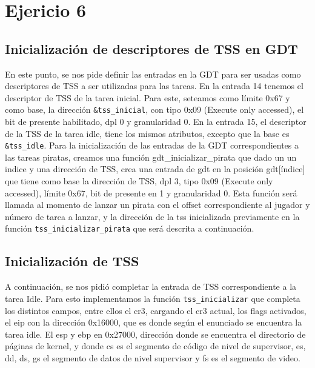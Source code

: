 \section{Ejericio 6}
\subsection{Inicialización de descriptores de TSS en GDT}

En este punto, se nos pide definir las entradas en la GDT para ser usadas como descriptores de TSS a ser utilizadas para las tareas.
En la entrada 14 tenemos el descriptor de TSS de la tarea inicial. Para este, seteamos como límite 0x67 y como base, la dirección \texttt{\&tss\_inicial}, con tipo 0x09 (Execute only accessed), el bit de presente habilitado, dpl 0 y granularidad 0.
En la entrada 15, el descriptor de la TSS de la tarea idle, tiene los mismos atributos, excepto que la base es \texttt{\&tss\_idle}.
Para la inicialización de las entradas de la GDT correspondientes a las tareas piratas, creamos una función gdt\_inicializar\_pirata que dado un un indice y una dirección de TSS, crea una entrada de gdt en la posición gdt[índice] que tiene como base la dirección de TSS, dpl 3, tipo 0x09 (Execute only accessed), límite 0x67, bit de presente en 1 y granularidad 0. Esta función será llamada al momento de lanzar un pirata con el offset correspondiente al jugador y número de tarea a lanzar, y la dirección de la tss inicializada previamente en la función \texttt{tss\_inicializar\_pirata} que será descrita a continuación.


\subsection{Inicialización de TSS}

A continuación, se nos pidió completar la entrada de TSS correspondiente a la tarea Idle. Para esto implementamos la función \texttt{tss\_inicializar} que completa los distintos campos, entre ellos el cr3, cargando el cr3 actual, los flags activados, el eip con la dirección 0x16000, que es donde según el enunciado se encuentra la tarea idle. El esp y ebp en 0x27000, dirección donde se encuentra el directorio de páginas de kernel, y donde cs es el segmento de código de nivel de supervisor, es, dd, ds, gs el segmento de datos de nivel supervisor y fs es el segmento de video.

